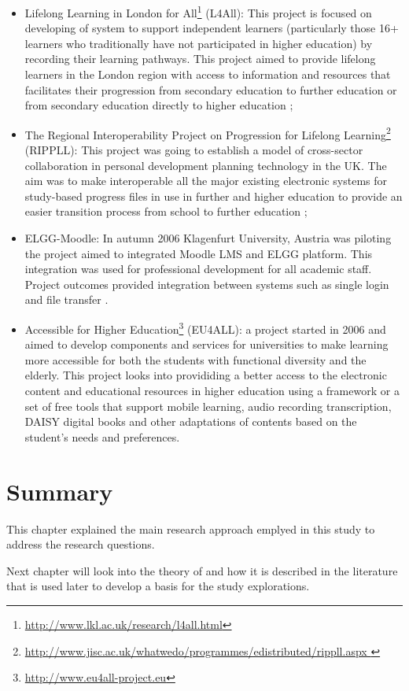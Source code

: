 \begin{itemize}

  \item Lifelong Learning in London for
  All\footnote{\url{http://www.lkl.ac.uk/research/l4all.html}} (L4All): This
  project is focused on developing of \LLLs system to support independent
  learners (particularly those 16+ learners who traditionally have not
  participated in higher education) by recording their learning pathways. This
  project aimed to provide lifelong learners in the London region with access to
  information and resources that facilitates their progression from secondary
  education to further education or from secondary education directly to higher
  education \citep{Freitas2006};

  \item The Regional Interoperability Project on Progression for Lifelong
Learning\footnote{\url{http://www.jisc.ac.uk/whatwedo/programmes/edistributed/rippll.aspx
}} (RIPPLL): This project was going to establish a model of cross-sector
collaboration in personal development planning technology in the UK. The aim was
to make interoperable all the major existing electronic systems for study-based
progress files in use in further and higher education to provide an easier
transition process from school to further education \citep{Hartnell-Young2006};

  \item ELGG-Moodle: In autumn 2006 Klagenfurt University, Austria was piloting
the project aimed to integrated Moodle LMS and ELGG platform. This integration
was used for professional development for all academic staff. Project outcomes
provided integration between systems such as single login and file transfer
\citep{Attwell2007}.

  \item Accessible \LLLc for Higher
Education\footnote{\url{http://www.eu4all-project.eu}} (EU4ALL): a project
started in 2006 and aimed to develop components and services for universities to
make learning more accessible for both the students with functional diversity
and the elderly. This project looks into provididing a better access to the
electronic content and educational resources in higher education using a
framework or a set of free tools that support mobile learning, audio recording
transcription, DAISY digital books and other adaptations of contents based on
the student's needs and preferences.

\end{itemize}

\section{Summary}

This chapter explained the main research approach emplyed in this study to
address the research questions.

Next chapter will look into the theory of \LLLs and how it is described in the
literature that is used later to develop a basis for the study explorations.
